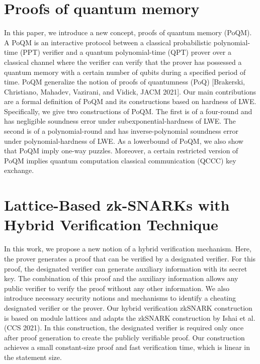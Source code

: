 \documentclass[11pt,oneside]{book}
\theoremstyle{definition}
\theoremstyle{remark}
\theoremstyle{plain}
\begin{document}
\section{\cite{cryptoeprint:2025/1837} Proofs of quantum memory}
In this paper, we introduce a new concept, proofs of quantum memory (PoQM). A PoQM is an interactive protocol between a classical probabilistic polynomial-time (PPT) verifier and a quantum polynomial-time (QPT) prover over a classical channel where the verifier can verify that the prover has possessed a quantum memory with a certain number of qubits during a specified period of time. PoQM generalize the notion of proofs of quantumness (PoQ) [Brakerski, Christiano, Mahadev, Vazirani, and Vidick, JACM 2021]. Our main contributions are a formal definition of PoQM and its constructions based on hardness of LWE. Specifically, we give two constructions of PoQM. The first is of a four-round and has negligible soundness error under subexponential-hardness of LWE. The second is of a polynomial-round and has inverse-polynomial soundness error under polynomial-hardness of LWE.  As a lowerbound of PoQM, we also show that PoQM imply one-way puzzles. Moreover, a certain restricted version of PoQM implies quantum computation classical communication (QCCC) key exchange.

\section{\cite{cryptoeprint:2025/1839} Lattice-Based zk-SNARKs with Hybrid Verification Technique}
In this work, we propose a new notion of a hybrid verification mechanism. Here, the prover generates a proof that can be verified by a designated verifier. For this proof, the designated verifier can generate auxiliary information with its secret key. The combination of this proof and the auxiliary information allows any public verifier to verify the proof without any other information. We also introduce necessary security notions and mechanisms to identify a cheating designated verifier or the prover. Our hybrid verification zkSNARK construction is based on module lattices and adapts the zkSNARK construction by Ishai et al. (CCS 2021). In this construction, the designated verifier is required only once after proof generation to create the publicly verifiable proof. Our construction achieves a small constant-size proof and fast verification time, which is linear in the statement size.
\end{document}
